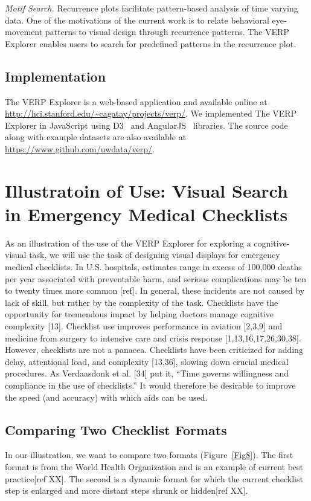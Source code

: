\documentclass{sigchi}
\begin{document}
\emph{Motif Search.} Recurrence plots facilitate pattern-based analysis of
time varying data. One of the motivations of the current work is to relate
behavioral eye-movement patterns to visual design through recurrence
patterns. The VERP Explorer enables users to search for predefined patterns
in the recurrence plot. 


\subsection{Implementation}  The VERP Explorer is a web-based application
and available online  at
\url{http://hci.stanford.edu/~cagatay/projects/verp/}.  We implemented The
VERP Explorer in JavaScript using D3~\cite{d3_infovis11} and
AngularJS~\cite{angularweb} libraries.  The source code along with example
datasets are also available at \url{https://www.github.com/uwdata/verp/}. 



\section{Illustratoin of Use: Visual Search in Emergency Medical Checklists}

As an illustration of the use of the VERP Explorer for exploring a
cognitive-visual task, we will use the task of designing visual displays
for emergency medical checklists. In U.S. hospitals, estimates range in
excess of 100,000 deaths per year associated with preventable harm, and
serious complications may be ten to twenty times more common [ref]. In
general, these incidents are not caused by lack of skill, but rather by the
complexity of the task.  Checklists have the opportunity for tremendous
impact by helping doctors manage cognitive complexity [13]. Checklist use
improves performance in aviation [2,3,9] and medicine from surgery to
intensive care and crisis response [1,13,16,17,26,30,38]. However,
checklists are not a panacea. Checklists have been criticized for adding
delay, attentional load, and complexity [13,36], slowing down crucial
medical procedures. As Verdaasdonk et al.  [34] put it, “Time governs
willingness and compliance in the use of checklists.” It would therefore be
desirable to improve the speed (and accuracy) with which aids can be used.

\subsection{Comparing Two Checklist Formats} In our illustration, we want
to compare two formats (Figure~\ref{Fig8}). The first format is from the World Health
Organization and is an example of current best practice[ref XX]. The second
is a dynamic format for which the current checklist step is enlarged and
more distant steps shrunk or hidden[ref XX].
\end{document}
